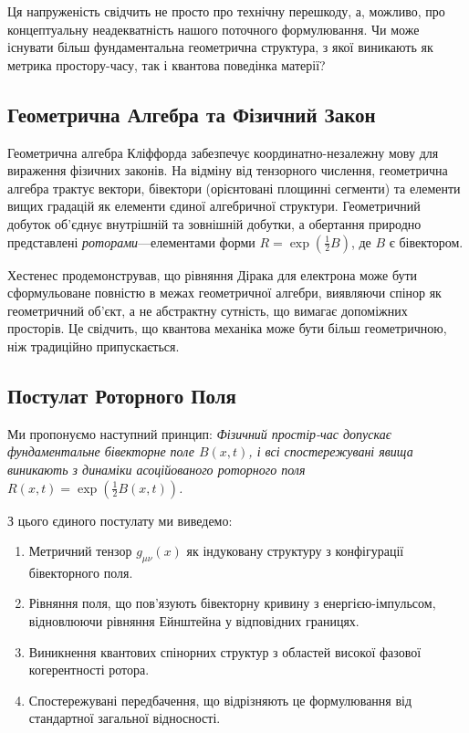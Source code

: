 \documentclass[11pt,a4paper]{article}
\numberwithin{equation}{section}
\theoremstyle{plain}
\theoremstyle{definition}
\theoremstyle{remark}
\begin{document}
Ця напруженість свідчить не просто про технічну перешкоду, а, можливо, про концептуальну неадекватність нашого поточного формулювання. Чи може існувати більш фундаментальна геометрична структура, з якої виникають як метрика простору-часу, так і квантова поведінка матерії?

\subsection{Геометрична Алгебра та Фізичний Закон}

Геометрична алгебра Кліффорда забезпечує координатно-незалежну мову для вираження фізичних законів. На відміну від тензорного числення, геометрична алгебра трактує вектори, бівектори (орієнтовані площинні сегменти) та елементи вищих градацій як елементи єдиної алгебричної структури. Геометричний добуток об'єднує внутрішній та зовнішній добутки, а обертання природно представлені \emph{роторами}---елементами форми $R=\exp(\frac{1}{2}B)$, де $B$ є бівектором.

Хестенес продемонстрував, що рівняння Дірака для електрона може бути сформульоване повністю в межах геометричної алгебри, виявляючи спінор як геометричний об'єкт, а не абстрактну сутність, що вимагає допоміжних просторів. Це свідчить, що квантова механіка може бути більш геометричною, ніж традиційно припускається.

\subsection{Постулат Роторного Поля}

Ми пропонуємо наступний принцип: \emph{Фізичний простір-час допускає фундаментальне бівекторне поле $B(x,t)$, і всі спостережувані явища виникають з динаміки асоційованого роторного поля $R(x,t)=\exp(\frac{1}{2}B(x,t))$.}

З цього єдиного постулату ми виведемо:

\begin{enumerate}
  \item Метричний тензор $g_{\mu\nu}(x)$ як індуковану структуру з конфігурації бівекторного поля.
  \item Рівняння поля, що пов'язують бівекторну кривину з енергією-імпульсом, відновлюючи рівняння Ейнштейна у відповідних границях.
  \item Виникнення квантових спінорних структур з областей високої фазової когерентності ротора.
  \item Спостережувані передбачення, що відрізняють це формулювання від стандартної загальної відносності.
\end{enumerate}
\end{document}
